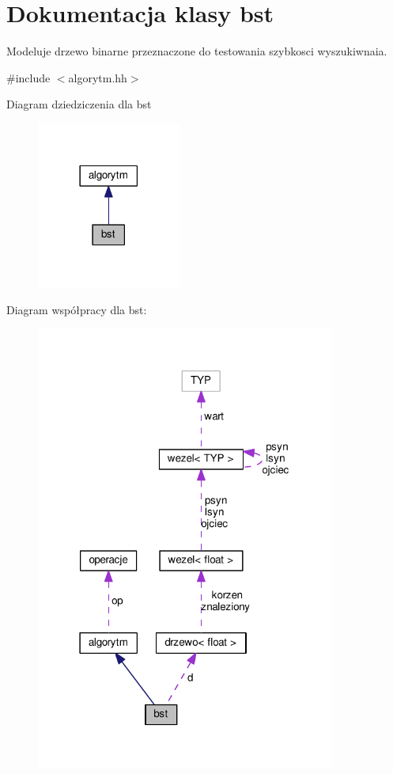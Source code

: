 \hypertarget{classbst}{\section{Dokumentacja klasy bst}
\label{classbst}
}


Modeluje drzewo binarne przeznaczone do testowania szybkosci wyszukiwnaia.  




{\ttfamily \#include $<$algorytm.\-hh$>$}



Diagram dziedziczenia dla bst\nopagebreak
\begin{figure}[H]
\begin{center}
\leavevmode
\includegraphics[width=134pt]{classbst__inherit__graph}
\end{center}
\end{figure}


Diagram współpracy dla bst\-:\nopagebreak
\begin{figure}[H]
\begin{center}
\leavevmode
\includegraphics[width=279pt]{classbst__coll__graph}
\end{center}
\end{figure}
